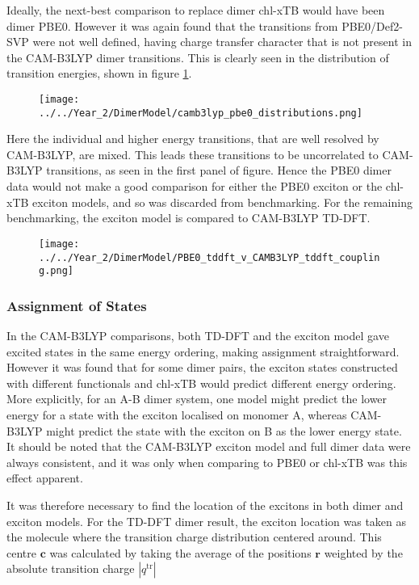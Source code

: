 Ideally, the next-best comparison to replace dimer chl-xTB would have been dimer
PBE0. However it was again found that the transitions from PBE0/Def2-SVP were not
well defined, having charge transfer character that is not present in the CAM-B3LYP
dimer transitions. This is clearly seen in the distribution of transition energies, 
shown in figure \ref{fig:camb3lyp_pbe0_distributions}.

\begin{figure}
    \centering
    \texttt{[image: ../../Year\_2/DimerModel/camb3lyp\_pbe0\_distributions.png]}
    \label{fig:camb3lyp_pbe0_distributions}
\end{figure}

Here the individual \Qy and higher energy transitions, that are well resolved by CAM-B3LYP,
are mixed. This leads these transitions to be uncorrelated to CAM-B3LYP transitions,
as seen in the first panel of figure. Hence the PBE0 dimer data would not make a 
good comparison for either the PBE0 exciton or the chl-xTB exciton models, and so
was discarded from benchmarking. For the remaining benchmarking, the exciton model
is compared to CAM-B3LYP TD-DFT.

\begin{figure}
    \texttt{[image: ../../Year\_2/DimerModel/PBE0\_tddft\_v\_CAMB3LYP\_tddft\_coupling.png]}
\end{figure}

\afterpartskip
\subsubsection{Assignment of States}
\label{subsec:state_assign}

In the CAM-B3LYP comparisons, both TD-DFT and the exciton model gave excited states
in the same energy ordering, making assignment straightforward. However it was found
that for some dimer pairs, the exciton states constructed with different functionals 
and chl-xTB would predict different energy ordering. More explicitly, for an A-B 
dimer system, one model might predict the lower energy for a state with the exciton
localised on monomer A, whereas CAM-B3LYP might predict the state with the exciton
on B as the lower energy state. It should be noted that the CAM-B3LYP exciton model 
and full dimer data were always consistent, and it was only when comparing to PBE0 
or chl-xTB was this effect apparent.

It was therefore necessary to find the location of the excitons in both dimer and
exciton models. For the TD-DFT dimer result, the exciton location was taken as the
molecule where the transition charge distribution centered around. This centre
$\mathbf{c}$ was calculated by taking the average of the positions $\mathbf{r}$
weighted by the absolute transition charge $\left\lvert q^{\text{tr}} \right\rvert$

